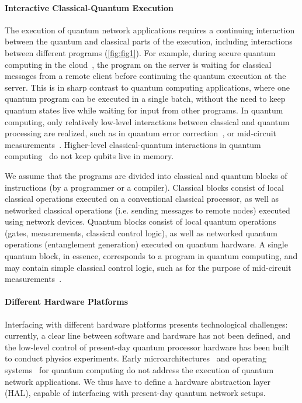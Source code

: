 \paragraph{Interactive Classical-Quantum Execution}
The execution of quantum network applications requires a continuing interaction between the quantum and classical parts of the execution, including interactions between different programs (\cref{fig:fig1}). For example, during secure quantum computing in the cloud~\cite{broadbent_2009_ubqc,ma_qenclave-practical_2022}, the program on the server is waiting for classical messages from a remote client before continuing the quantum execution at the server. This is in sharp contrast to quantum computing applications, where one quantum program can be executed in a single batch, without the need to keep quantum states live while waiting for input from other programs. In quantum computing, only relatively low-level interactions between classical and quantum processing are realized, such as in quantum error correction~\cite{lidar2013quantum}, or mid-circuit measurements~\cite{botelho_error_2022}. Higher-level classical-quantum interactions in quantum computing~\cite{bharti_noisy_2022} do not keep qubits live in memory.

We assume that the programs are divided into classical and quantum blocks of instructions (by a programmer or a compiler). Classical blocks consist of local classical operations executed on a conventional classical processor, as well as networked classical operations (i.e. sending messages to remote nodes) executed using network devices. Quantum blocks consist of local quantum operations (gates, measurements, classical control logic), as well as networked quantum operations (entanglement generation) executed on quantum hardware. A single quantum block, in essence, corresponds to a program in quantum computing, and may contain simple classical control logic, such as for the purpose of mid-circuit measurements~\cite{botelho_error_2022}.

\paragraph{Different Hardware Platforms}
Interfacing with different hardware platforms presents technological challenges: currently, a clear line between software and hardware has not been defined, and the low-level control of present-day quantum processor hardware has been built to conduct physics experiments. Early microarchitectures~\cite{bertels_quantum_2020,fu_2019_eqasm} and operating systems~\cite{giortamis_qos_2024,kong_2021_origin} for quantum computing do not address the execution of quantum network applications. We thus have to define a hardware abstraction layer (HAL), capable of interfacing with present-day quantum network setups. 

